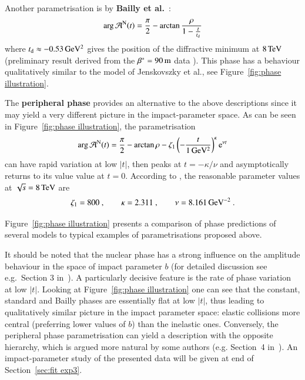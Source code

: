 Another parametrisation is by {\bf Bailly et al.}~\cite{bailly87}:
\begin{equation}
\label{eq:nuc phase bai}
	\arg {\cal A}^{\rm N}(t) = {\pi\over 2} - \arctan {\rho\over 1 - {t\over t_{\rm d}}}
\end{equation}
where $t_{\rm d} \approx -0.53\,{\rm GeV^2}$ gives the position of the diffractive minimum at $8\,{\rm TeV}$ (preliminary result derived from the $\beta^* = 90\,{\rm m}$ data \cite{8tev-90m}). This phase has a behaviour qualitatively similar to the model of Jenskovszky et al., see Figure~\ref{fig:phase illustration}.

The {\bf peripheral phase} \cite{kl94} provides an alternative to the above descriptions since it may yield a very different picture in the impact-parameter space. As can be seen in Figure~\ref{fig:phase illustration}, the parametrisation
\begin{equation}
\label{eq:nuc phase per}
\arg {\cal A}^{\rm N}(t) = {\pi\over 2} - \arctan\rho - \zeta_1 \left(- {t\over 1\un{GeV^2}} \right)^\kappa \e^{\nu t}
\end{equation}
can have rapid variation at low $|t|$, then peaks at $t = -\kappa / \nu$ and asymptotically returns to its value value at $t=0$. According to \cite{kl-8tev}, the reasonable parameter values at $\sqrt s = 8\,{\rm TeV}$ are
\begin{equation}
\label{eq:nuc phase per val}
	\zeta_1 = 800\ ,\qquad
	\kappa = 2.311\ ,\qquad
	\nu = 8.161\,{\rm GeV^{-2}}\ .
\end{equation}

Figure~\ref{fig:phase illustration} presents a comparison of phase predictions of several models to typical examples of parametrisations proposed above.

It should be noted that the nuclear phase has a strong influence on the amplitude behaviour in the space of impact parameter $b$ (for detailed discussion see e.g.~Section 3 in~\cite{klk02}). A particularly decisive feature is the rate of phase variation at low $|t|$. Looking at Figure~\ref{fig:phase illustration} one can see that the constant, standard and Bailly phases are essentially flat at low $|t|$, thus leading to qualitatively similar picture in the impact parameter space: elastic collisions more central (preferring lower values of $b$) than the inelastic ones. Conversely, the peripheral phase parametrisation can yield a description with the opposite hierarchy, which is argued more natural by some authors (e.g. Section~4 in~\cite{kl96}). An impact-parameter study of the presented data will be given at end of Section~\ref{sec:fit exp3}.

